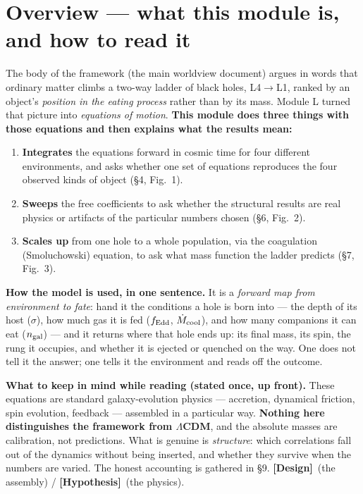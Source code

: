 \documentclass[11pt]{article}
\newcommand{\Hyp}{\textbf{\textcolor{blue!55!black}{[Hypothesis]}}}
\newcommand{\Design}{\textbf{\textcolor{purple!65!black}{[Design]}}}
\begin{document}
\section{Overview --- what this module is, and how to read it}
The body of the framework (the main worldview document) argues in words that ordinary matter climbs a two-way ladder of black holes, L4$\to$L1, ranked by an object's \emph{position in the eating process} rather than by its mass. Module L turned that picture into \emph{equations of motion}. \textbf{This module does three things with those equations and then explains what the results mean:}
\begin{enumerate}[leftmargin=1.5em,itemsep=2pt]
\item \textbf{Integrates} the equations forward in cosmic time for four different environments, and asks whether one set of equations reproduces the four observed kinds of object (\S4, Fig.~1).
\item \textbf{Sweeps} the free coefficients to ask whether the structural results are real physics or artifacts of the particular numbers chosen (\S6, Fig.~2).
\item \textbf{Scales up} from one hole to a whole population, via the coagulation (Smoluchowski) equation, to ask what mass function the ladder predicts (\S7, Fig.~3).
\end{enumerate}

\textbf{How the model is used, in one sentence.} It is a \emph{forward map from environment to fate}: hand it the conditions a hole is born into --- the depth of its host ($\sigma$), how much gas it is fed ($f_{\rm Edd}$, $\dot M_{\rm cool}$), and how many companions it can eat ($n_{\rm gal}$) --- and it returns where that hole ends up: its final mass, its spin, the rung it occupies, and whether it is ejected or quenched on the way. One does not tell it the answer; one tells it the environment and reads off the outcome.

\textbf{What to keep in mind while reading (stated once, up front).} These equations are standard galaxy-evolution physics --- accretion, dynamical friction, spin evolution, feedback --- assembled in a particular way. \textbf{Nothing here distinguishes the framework from $\Lambda$CDM}, and the absolute masses are calibration, not predictions. What is genuine is \emph{structure}: which correlations fall out of the dynamics without being inserted, and whether they survive when the numbers are varied. The honest accounting is gathered in \S9. \Design\ (the assembly) / \Hyp\ (the physics).
\end{document}

